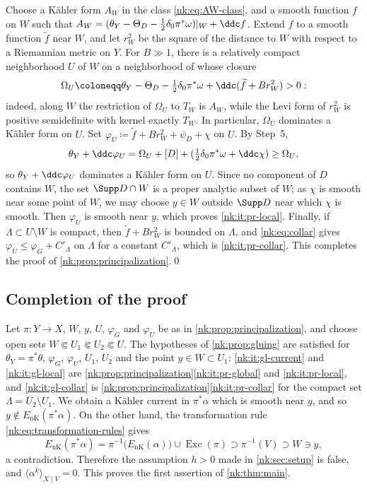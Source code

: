 Choose a K\"ahler form $A_W$ in the class \eqref{nk:eq:AW-class}, and a smooth function $f$ on $W$ such
that
$A_W=(\theta_Y-\Theta_D-\tfrac12\delta_0\pi^*\omega)|_W+\ddc f$.
Extend $f$ to a smooth function $\widetilde f$ near $W$, and let
$r_W^2$ be the square of the distance to $W$ with respect to a
Riemannian metric on $Y$. For $B\gg1$, there is a relatively compact
neighborhood $U$ of $W$ on a neighborhood of whose closure
\[
  \Omega_U\coloneqq \theta_Y-\Theta_D-\tfrac12\delta_0\pi^*\omega
       +\ddc(\widetilde f+Br_W^2)>0 :
\]
indeed, along $W$ the restriction of $\Omega_U$ to $T_W$ is
$A_W$, while the Levi form of $r_W^2$ is positive semidefinite with
kernel exactly $T_W$. In particular, $\Omega_U$ dominates a K\"ahler
form on $U$. Set
$\varphi_U\coloneqq \widetilde f+Br_W^2+\psi_D+\chi$ on $U$. By Step~5,
\[
  \theta_Y+\ddc\varphi_U
  =\Omega_U+[D]+(\tfrac12\delta_0\pi^*\omega+\ddc\chi)
  \ge\Omega_U ,
\]
so $\theta_Y+\ddc\varphi_U$ dominates a K\"ahler form on $U$.
Since no component of $D$ contains $W$, the set $\Supp D\cap W$
is a proper analytic subset of $W$; as $\chi$ is smooth near some
point of $W$, we may choose $y\in W$ outside $\Supp D$ near which
$\chi$ is smooth. Then $\varphi_U$ is smooth near $y$, which
proves \ref{nk:it:pr-local}. Finally, if $\Lambda\subset U\setminus W$ is
compact, then $\widetilde f+Br_W^2$ is bounded on $\Lambda$, and
\eqref{nk:eq:collar} gives $\varphi_U\le\varphi_G+C'_\Lambda$ on
$\Lambda$ for a constant $C'_\Lambda$, which is
\ref{nk:it:pr-collar}. This completes the proof of
\cref{nk:prop:principalization}.\qed

\subsection{Completion of the proof}\label{nk:sec:gluing}

Let $\pi\colon Y\to X$, $W$, $y$, $U$, $\varphi_G$ and
$\varphi_U$ be as in \cref{nk:prop:principalization}, and choose open
sets $W\Subset U_1\Subset U_2\Subset U$. The hypotheses of
\cref{nk:prop:gluing} are satisfied for $\theta_Y=\pi^*\theta$,
$\varphi_G$, $\varphi_U$, $U_1$, $U_2$ and the point
$y\in W\subset U_1$: \ref{nk:it:gl-current} and \ref{nk:it:gl-local} are
\cref{nk:prop:principalization}\ref{nk:it:pr-global} and
\ref{nk:it:pr-local}, and \ref{nk:it:gl-collar} is
\cref{nk:prop:principalization}\ref{nk:it:pr-collar} for the compact set
$\Lambda=\overline U_2\setminus U_1$. We obtain a K\"ahler current in
$\pi^*\alpha$ which is smooth near $y$, and so
$y\notin{E_{\mathrm{nK}}}(\pi^*\alpha)$. On the other hand, the transformation rule
\eqref{nk:eq:transformation-rules} gives
\[
  {E_{\mathrm{nK}}}(\pi^*\alpha)=\pi^{-1}\bigl({E_{\mathrm{nK}}}(\alpha)\bigr)\cup\operatorname{Exc}(\pi)
  \supset\pi^{-1}(V)\supset W\ni y,
\]
a contradiction. Therefore the assumption $h>0$ made in
\cref{nk:sec:setup} is false, and
$\langle\alpha^k\rangle_{X\mid V}=0$.
This proves the first assertion of \cref{nk:thm:main}.

